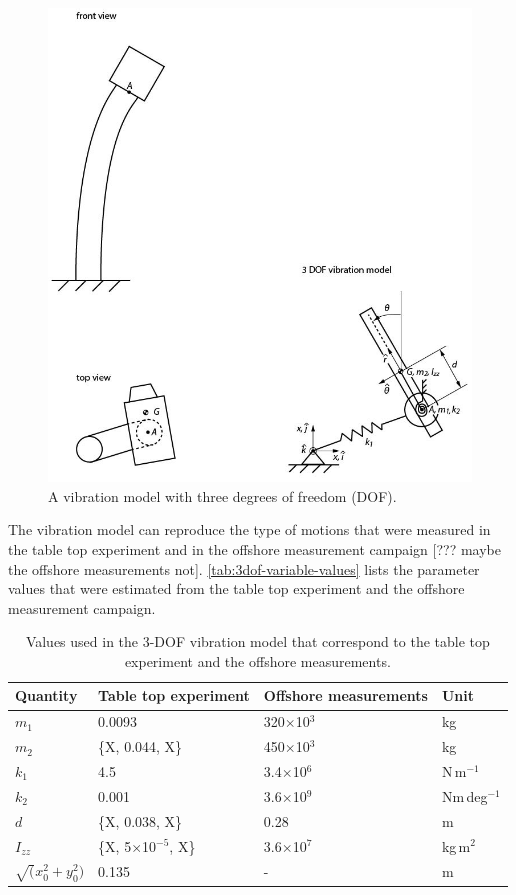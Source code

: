 \documentclass{article}
\begin{document}
\begin{figure}
    \centering
    \includegraphics{manuscript/figures/vibration_model.jpg}
    \caption{A vibration model with three degrees of freedom (DOF).}
    \label{fig:3dof-system}
\end{figure}

The vibration model can reproduce the type of motions that were measured in the table top experiment and in the offshore measurement campaign [??? maybe the offshore measurements not]. \autoref{tab:3dof-variable-values} lists the parameter values that were estimated from the table top experiment and the offshore measurement campaign.

\begin{table}[]
    \centering
    \begin{tabular}{l l l l}
    \toprule
         Quantity & Table top experiment & Offshore measurements & Unit \\
         \midrule
         $m_1$ & 0.0093 & 320$\times$10$^3$ & kg\\ 
         $m_2$ & \{X, 0.044, X\} & 450$\times$10$^3$ & kg\\ 
         $k_1$ & 4.5 & 3.4$\times$10$^6$ & N\,m$^{-1}$ \\ 
         $k_2$ & 0.001 & 3.6$\times$10$^9$ & Nm\,deg$^{-1}$ \\ 
         $d$ & \{X, 0.038, X\} & 0.28 & m\\ 
         $I_{zz}$ & \{X, 5$\times$10$^{-5}$, X\} & 3.6$\times$10$^7$ & kg\,m$^2$ \\ 
         $\sqrt(x_0^2 + y_0^2)$ & 0.135 & - & m\\
         \bottomrule
    \end{tabular}
    \caption{Values used in the 3-DOF vibration model that correspond to the table top experiment and the offshore measurements.}
    \label{tab:3dof-variable-values}
\end{table}
\end{document}
